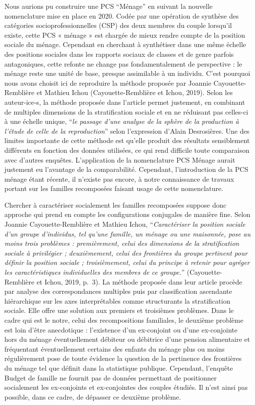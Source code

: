 \documentclass[
  12pt,
]{book}
\begin{document}
Nous aurions pu construire une PCS ``Ménage'' en suivant la nouvelle
nomenclature mise en place en 2020. Codée par une opération de synthèse
des catégories socioprofessionnelles (CSP) des deux membres du couple
lorsqu'il existe, cette PCS « ménage » est chargée de mieux rendre
compte de la position sociale du ménage. Cependant en cherchant à
synthétiser dans une même échelle des positions sociales dans les
rapports sociaux de classes et de genre parfois antagoniques, cette
refonte ne change pas fondamentalement de perspective : le ménage reste
une unité de base, presque assimilable à un individu. C'est pourquoi
nous avons choisit ici de reproduire la méthode proposée par Joannie
Cayouette-Remblière et Mathieu Ichou (Cayouette-Remblière et Ichou,
2019). Selon les auteur-ice-s, la méthode proposée dans l'article permet
justement, en combinant de multiples dimensions de la stratification
sociale et en ne réduisant pas celles-ci à une échelle unique,
``\emph{le passage d'une analyse de la sphère de la production à l'étude
de celle de la reproduction}'' selon l'expression d'Alain Desrosières.
Une des limites importante de cette méthode est qu'elle produit des
résultats sensiblement différents en fonction des données utilisées, ce
qui rend difficile toute comparaison avec d'autres enquêtes.
L'application de la nomenclature PCS Ménage aurait justement eu
l'avantage de la comparabilité. Cependant, l'introduction de la PCS
ménage étant récente, il n'existe pas encore, à notre connaissance de
travaux portant sur les familles recomposées faisant usage de cette
nomenclature.

Chercher à caractériser socialement les familles recomposées suppose
donc approche qui prend en compte les configurations conjugales de
manière fine. Selon Joannie Cayouette-Remblière et Mathieu Ichou,
``\emph{Caractériser la position sociale d'un groupe d'individus, tel
qu'une famille, un ménage ou une maisonnée, pose au moins trois
problèmes : premièrement, celui des dimensions de la stratification
sociale à privilégier ; deuxièmement, celui des frontières du groupe
pertinent pour définir la position sociale ; troisièmement, celui du
principe à retenir pour agréger les caractéristiques individuelles des
membres de ce groupe.}'' (Cayouette-Remblière et Ichou, 2019, p.~3). La
méthode proposée dans leur article procède par analyse des
correspondances multiples puis par classification ascendante
hiérarchique sur les axes interprétables comme structurants la
stratification sociale. Elle offre une solution aux premiers et
troisièmes problèmes. Dans le cadre qui est le notre, celui des
recompositions familiales, le deuxième problème est loin d'être
anecdotique : l'existence d'un ex-conjoint ou d'une ex-conjointe hors du
ménage éventuellement débiteur ou débitrice d'une pension alimentaire et
fréquentant éventuellement certains des enfants du ménage plus ou moins
régulièrement pose de toute évidence la question de la pertinence des
frontières du ménage tel que définit dans la statistique publique.
Cependant, l'enquête Budget de famille ne fournit pas de données
permettant de positionner socialement les ex-conjoints et ex-conjointes
des couples étudiés. Il n'est ainsi pas possible, dans ce cadre, de
dépasser ce deuxième problème.
\end{document}
